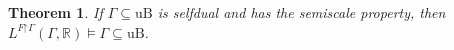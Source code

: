 \documentclass[fleqn, 11pt]{amsart}
\theoremstyle{plain}
\newtheorem{thm}{Theorem}[section]
\newtheorem{lem}[thm]{Lemma} \newtheorem*{lem*}{Lemma}
\theoremstyle{definition}
\theoremstyle{remark}
\newcommand{\uB}{\mathrm{uB}}
\newcommand{\restrict}{\mathord{\restriction}}
\begin{document}
\begin{thm}\label{FreflectsuBthrm}
 If $\Gamma \subseteq \uB$ is selfdual and has the semiscale property, then
 $L^{F \restrict \Gamma}(\Gamma, \mathbb{R}) \models \Gamma \subseteq \uB$.
\end{thm}




\end{document}
